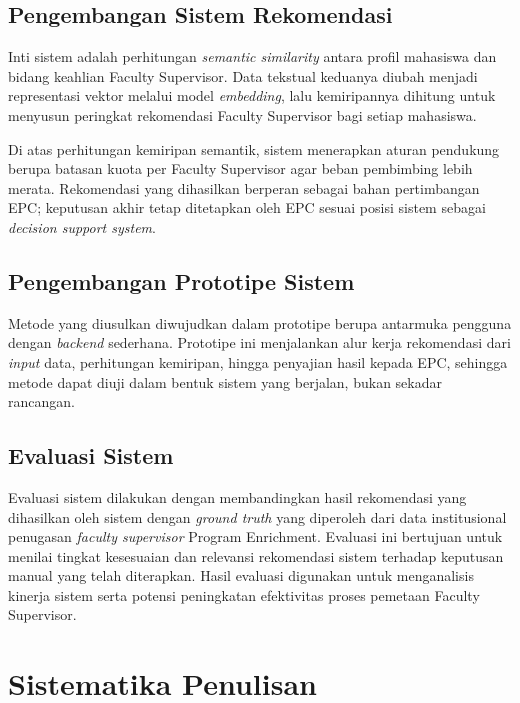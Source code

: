 \subsection{Pengembangan Sistem Rekomendasi}\label{pengembangan-sistem-rekomendasi}

Inti sistem adalah perhitungan \textit{semantic similarity} antara profil mahasiswa dan bidang keahlian Faculty Supervisor. Data tekstual keduanya diubah menjadi representasi vektor melalui model \textit{embedding}, lalu kemiripannya dihitung untuk menyusun peringkat rekomendasi Faculty Supervisor bagi setiap mahasiswa.

Di atas perhitungan kemiripan semantik, sistem menerapkan aturan pendukung berupa batasan kuota per Faculty Supervisor agar beban pembimbing lebih merata. Rekomendasi yang dihasilkan berperan sebagai bahan pertimbangan EPC; keputusan akhir tetap ditetapkan oleh EPC sesuai posisi sistem sebagai \textit{decision support system}.

\subsection{Pengembangan Prototipe Sistem}\label{pengembangan-prototipe-sistem}

Metode yang diusulkan diwujudkan dalam prototipe berupa antarmuka pengguna dengan \textit{backend} sederhana. Prototipe ini menjalankan alur kerja rekomendasi dari \textit{input} data, perhitungan kemiripan, hingga penyajian hasil kepada EPC, sehingga metode dapat diuji dalam bentuk sistem yang berjalan, bukan sekadar rancangan.

\subsection{Evaluasi Sistem}\label{evaluasi-sistem}

Evaluasi sistem dilakukan dengan membandingkan hasil rekomendasi yang dihasilkan oleh sistem dengan \textit{ground truth} yang diperoleh dari data institusional penugasan \textit{faculty supervisor} Program Enrichment. Evaluasi ini bertujuan untuk menilai tingkat kesesuaian dan relevansi rekomendasi sistem terhadap keputusan manual yang telah diterapkan. Hasil evaluasi digunakan untuk menganalisis kinerja sistem serta potensi peningkatan efektivitas proses pemetaan Faculty Supervisor.

\section{Sistematika Penulisan}\label{sistematika-penulisan}

